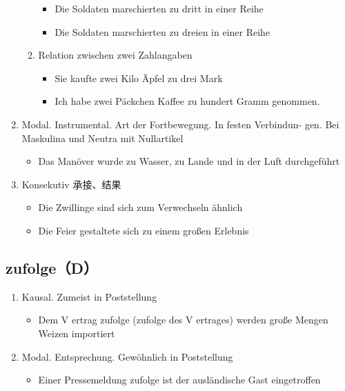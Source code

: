 \documentclass[UTF8]{report}
\begin{document}
\begin{enumerate}
\begin{enumerate}
        \begin{itemize}
            \item Die Soldaten marschierten zu dritt in einer Reihe
            \item Die Soldaten marschierten zu dreien in einer Reihe
        \end{itemize}
        \item Relation zwischen zwei Zahlangaben
        \begin{itemize}
            \item Sie kaufte zwei Kilo Äpfel zu drei Mark
            \item Ich habe zwei Päckchen Kaffee zu hundert Gramm genommen.
        \end{itemize}
    \end{enumerate}
    \item Modal. Instrumental. Art der Fortbewegung. In festen Verbindun- gen. Bei Maskulina und Neutra mit Nullartikel
    \begin{itemize}
        \item Das Manöver wurde zu Wasser, zu Lande und in der Luft durchgeführt
    \end{itemize}
    \item Konsekutiv 承接、结果
    \begin{itemize}
        \item Die Zwillinge sind sich zum Verwechseln ähnlich
        \item Die Feier gestaltete sich zu einem großen Erlebnis
    \end{itemize}
\end{enumerate}


\subsection{zufolge（D）}
\begin{enumerate}
    \item Kausal. Zumeist in Poststellung
    \begin{itemize}
        \item Dem V ertrag zufolge (zufolge des V ertrages) werden große Mengen Weizen importiert
    \end{itemize}
    \item Modal. Entsprechung. Gewöhnlich in Poststellung
    \begin{itemize}
        \item Einer Pressemeldung zufolge ist der ausländische Gast eingetroffen
    \end{itemize}
\end{enumerate}
\end{document}
